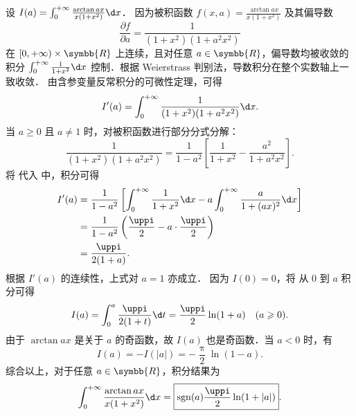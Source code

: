 \begin{solution}
    设 $I(a) = \int_0^{+\infty} \frac{\arctan ax}{x(1+x^2)} \d x$．
    因为被积函数 $f(x, a) = \frac{\arctan ax}{x(1+x^2)}$ 及其偏导数
    \begin{equation}\label{eq:q5-partial}
        \frac{\partial f}{\partial a} = \frac{1}{(1+x^2)(1+a^2 x^2)}
    \end{equation}
    在 $[0, +\infty) \times \symbb{R}$ 上连续，且对任意 $a \in \symbb{R}$，偏导数均被收敛的积分 $\int_0^{+\infty} \frac{1}{1+x^2} \d x$ 控制．根据 Weierstrass 判别法，导数积分在整个实数轴上一致收敛．
    由含参变量反常积分的可微性定理，可得
    \begin{equation}\label{eq:q5-deriv}
        I'(a) = \int_0^{+\infty} \frac{1}{(1+x^2)(1+a^2 x^2)} \d x.
    \end{equation}
    当 $a \geqslant 0$ 且 $a \neq 1$ 时，对被积函数进行部分分式分解：
    \begin{equation}\label{eq:q5-decomp}
        \frac{1}{(1+x^2)(1+a^2 x^2)} = \frac{1}{1-a^2} \left[ \frac{1}{1+x^2} - \frac{a^2}{1+a^2 x^2} \right].
    \end{equation}
    将  代入  中，积分可得
    \begin{equation}\label{eq:q5-deriv-calc}
        \begin{aligned}
            I'(a) & = \frac{1}{1-a^2} \left[ \int_0^{+\infty} \frac{1}{1+x^2} \d x - a \int_0^{+\infty} \frac{a}{1+(ax)^2} \d x \right] \\
                  & = \frac{1}{1-a^2} \left( \frac{\uppi}{2} - a \cdot \frac{\uppi}{2} \right)                                          \\
                  & = \frac{\uppi}{2(1+a)}.
        \end{aligned}
    \end{equation}
    根据 $I'(a)$ 的连续性，上式对 $a = 1$ 亦成立．
    因为 $I(0) = 0$，将  从 $0$ 到 $a$ 积分可得
    \begin{equation}\label{eq:q5-res-pos}
        I(a) = \int_0^a \frac{\uppi}{2(1+t)} \d t = \frac{\uppi}{2} \ln(1+a) \quad (a \geqslant 0).
    \end{equation}
    由于 $\arctan ax$ 是关于 $a$ 的奇函数，故 $I(a)$ 也是奇函数．当 $a < 0$ 时，有
    \begin{equation}\label{eq:q5-res-neg}
        I(a) = -I(|a|) = -\frac{\uppi}{2} \ln(1-a).
    \end{equation}
    综合以上，对于任意 $a \in \symbb{R}$，积分结果为
    \begin{equation}
        \int_0^{+\infty} \frac{\arctan ax}{x(1+x^2)} \d x = \boxed{\operatorname{sgn}(a) \frac{\uppi}{2} \ln(1 + |a|)}.
    \end{equation}


\end{solution}
